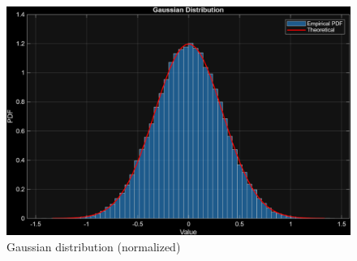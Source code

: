 \documentclass[11pt,a4paper]{article}
\begin{document}
\begin{figure}[H]
    \centering
    \includegraphics[width=1\textwidth]{img/task3_normal_dist.png}
    \caption{Gaussian distribution (normalized)}
    \label{fig:task3_normal_dist}
\end{figure}
\end{document}
